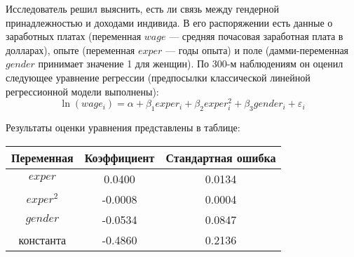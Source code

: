 \documentclass[addpoints, answers]{exam} %
\begin{document}
\begin{questions}



\question
Исследователь решил выяснить, есть ли связь между  гендерной принадлежностью и доходами индивида. В его распоряжении есть данные о заработных платах (переменная $wage$ --- средняя почасовая заработная плата в долларах), опыте (переменная $exper$ --- годы опыта) и поле  (дамми-переменная $gender$ принимает значение 1 для женщин). По 300-м наблюдениям он оценил следующее уравнение регрессии (предпосылки классической линейной регрессионной модели выполнены):
\[
\ln(wage_i) = \alpha + \beta_1 exper_i + \beta_2 exper_i^2 + \beta_3 gender_i + \varepsilon_i
\]

Результаты оценки уравнения представлены в таблице:
\begin{center}
\begin{tabular}{ccc} \toprule
Переменная & Коэффициент & Стандартная ошибка\\ \midrule
$exper$ & 0.0400 & 0.0134 \\
$exper^2$ & -0.0008 & 0.0004 \\
$gender$ & -0.0534 & 0.0847 \\
константа & -0.4860 & 0.2136 \\ \bottomrule
\end{tabular}
\end{center}


\begin{parts}


\end{parts}
\end{questions}
\end{document}
